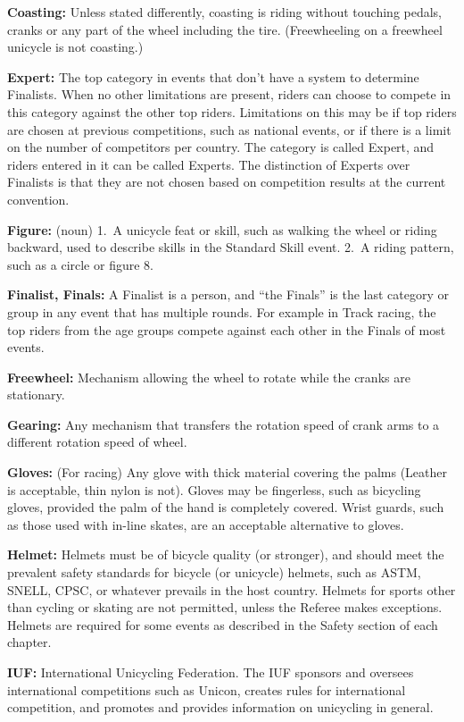 \textbf{Coasting:} Unless stated differently, coasting is riding without touching pedals, cranks or any part of the wheel including the tire.
(Freewheeling on a freewheel unicycle is not coasting.)

\textbf{Expert:} The top category in events that don't have a system to determine Finalists.
When no other limitations are present, riders can choose to compete in this category against the other top riders.
Limitations on this may be if top riders are chosen at previous competitions, such as national events, or if there is a limit on the number of competitors per country.
The category is called Expert, and riders entered in it can be called Experts.
The distinction of Experts over Finalists is that they are not chosen based on competition results at the current convention.

\textbf{Figure:} (noun) 1.~A unicycle feat or skill, such as walking the wheel or riding backward, used to describe skills in the Standard Skill event.
2.~A riding pattern, such as a circle or figure 8.

\textbf{Finalist, Finals:} A Finalist is a person, and ``the Finals'' is the last category or group in any event that has multiple rounds.
For example in Track racing, the top riders from the age groups compete against each other in the Finals of most events.

\textbf{Freewheel:} Mechanism allowing the wheel to rotate while the cranks are stationary.

\textbf{Gearing:} Any mechanism that transfers the rotation speed of crank arms to a different rotation speed of wheel.

\textbf{Gloves:} (For racing) Any glove with thick material covering the palms (Leather is acceptable, thin nylon is not).
Gloves may be fingerless, such as bicycling gloves, provided the palm of the hand is completely covered.
Wrist guards, such as those used with in-line skates, are an acceptable alternative to gloves.

\textbf{Helmet:} Helmets must be of bicycle quality (or stronger), and should meet the prevalent safety standards for bicycle (or unicycle) helmets, such as ASTM, SNELL, CPSC, or whatever prevails in the host country.
Helmets for sports other than cycling or skating are not permitted, unless the Referee makes exceptions.
Helmets are required for some events as described in the Safety section of each chapter.

\textbf{IUF:} International Unicycling Federation.
The IUF sponsors and oversees international competitions such as Unicon, creates rules for international competition, and promotes and provides information on unicycling in general.

